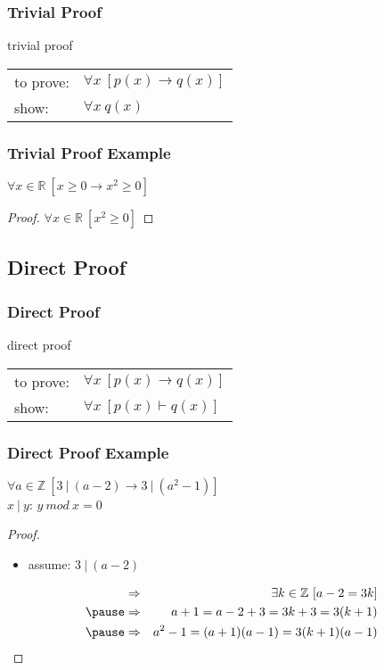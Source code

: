 \documentclass[dvipsnames]{beamer}
\begin{document}
\begin{frame}
  \frametitle{Trivial Proof}

  \begin{block}{trivial proof}
    \begin{tabular}{ll}
      to prove: & $\forall x~[p(x) \rightarrow q(x)]$\\
      show:     & $\forall x~q(x)$
    \end{tabular}
  \end{block}
\end{frame}

\begin{frame}
  \frametitle{Trivial Proof Example}

  \begin{theorem}
    $\forall x \in \mathbb{R}~[x \geq 0 \rightarrow x^2 \geq 0]$
  \end{theorem}

  \pause
  \begin{proof}
    $\forall x \in \mathbb{R}~[x^2 \geq 0]$
  \end{proof}
\end{frame}

\subsection{Direct Proof}

\begin{frame}
  \frametitle{Direct Proof}

  \begin{block}{direct proof}
    \begin{tabular}{ll}
      to prove: & $\forall x~[p(x) \rightarrow q(x)]$\\
      show:     & $\forall x~[p(x) \vdash q(x)]$
    \end{tabular}
  \end{block}
\end{frame}

\begin{frame}
  \frametitle{Direct Proof Example}

  \begin{theorem}
    $\forall a \in \mathbb{Z}~[3~|~(a-2) \rightarrow 3~|~(a^2-1)]$\\
    $x~|~y$: $y~mod~x = 0$
  \end{theorem}

  \pause
  \begin{proof}
    \begin{itemize}
      \item assume: $3~|~(a-2)$
    \end{itemize}

    \vspace{-2em}
    \begin{eqnarray*}
      & \Rightarrow & \exists k \in \mathbb{Z}~[a-2 = 3k]\\\pause
      & \Rightarrow & a+1 = a-2 + 3 = 3k+3 = 3(k+1)\\\pause
      & \Rightarrow & a^2-1 = (a+1)(a-1) = 3(k+1)(a-1)
    \end{eqnarray*}
  \end{proof}
\end{frame}
\end{document}
